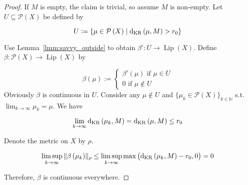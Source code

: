 \documentclass[11pt]{article}
\theoremstyle{definition}
\theoremstyle{plain}
\newcommand{\Nats}{\mathbb{N}}
\newcommand{\N}[1]{\lVert #1 \rVert}
\newcommand{\Sq}[2]{\{#1\}_{#2 \in \Nats}}
\newcommand{\PM}{\mathcal{P}}
\newcommand{\Lp}{{\operatorname{Lip}}}
\newcommand{\DKR}{\operatorname{d}_{\textnormal{KR}}}
\begin{document}
\begin{proof}

If $M$ is empty, the claim is trivial, so assume $M$ is non-empty. Let $U \subseteq \PM\left(X\right)$ be defined by

$$U:=\{\mu \in \PM\left(X\right) \mid \DKR\left(\mu, M\right) > r_0\}$$

Use Lemma~\ref{lmm:savvy_outside} to obtain $\beta': U \rightarrow \Lp\left(X\right)$. Define $\beta: \PM\left(X\right) \rightarrow \Lp\left(X\right)$ by

$$\beta\left(\mu\right):=\begin{cases}\beta'\left(\mu\right) \text{ if } \mu \in U\\0 \text { if } \mu \not\in U\end{cases}$$ 
Obviously $\beta$ is continuous in $U$. Consider any $\mu \not\in U$ and $\Sq{\mu_k \in \PM\left(X\right)}{k}$ s.t. $\lim_{k \rightarrow \infty} \mu_k = \mu$. We have 

$$\lim_{k \rightarrow \infty} \DKR\left(\mu_k,M\right) = \DKR\left(\mu, M\right) \leq r_0$$

Denote the metric on $X$ by $\rho$. 

$$\limsup_{k \rightarrow \infty}{\N{\beta\left(\mu_k\right)}_\rho} \leq \limsup_{k \rightarrow \infty}{\max\left(\DKR\left(\mu_k,M\right) - r_0, 0\right)} = 0$$

Therefore, $\beta$ is continuous everywhere.
\end{proof}
\end{document}
